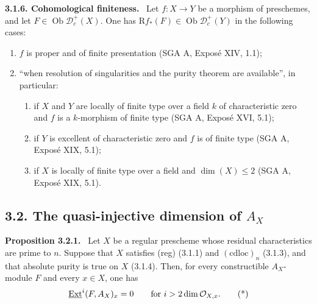 \documentclass[11pt]{article}
\theoremstyle{plain}
\theoremstyle{definition}
\theoremstyle{remark}
\newenvironment{statement}[1]{\par\medskip\noindent\textbf{#1.}\ }{\par\medskip}
\newcommand{\D}{\mathcal D}\newcommand{\E}{\mathcal E}\newcommand{\F}{\mathcal F}
\DeclareMathOperator{\ob}{Ob}
\newcommand{\R}{\mathrm R}
\begin{document}
\begin{statement}{3.1.6. Cohomological finiteness}
Let $f:X\to Y$ be a morphism of preschemes, and let $F\in\ob\D_c^+(X)$. One has $\R f_*(F)\in\ob\D_c^+(Y)$ in the following cases:
\begin{enumerate}[label=\alph*)]
\item $f$ is proper and of finite presentation (SGA A, Exposé XIV, 1.1);
\item ``when resolution of singularities and the purity theorem are available'', in particular:
\begin{enumerate}[label=(\roman*)]
\item if $X$ and $Y$ are locally of finite type over a field $k$ of characteristic zero and $f$ is a $k$-morphism of finite type (SGA A, Exposé XVI, 5.1);
\item if $Y$ is excellent of characteristic zero and $f$ is of finite type (SGA A, Exposé XIX, 5.1);
\item if $X$ is locally of finite type over a field and $\dim(X)\le2$ (SGA A, Exposé XIX, 5.1).
\end{enumerate}
\end{enumerate}
\end{statement}

\subsection*{3.2. The quasi-injective dimension of $A_X$}

\begin{statement}{Proposition 3.2.1}
Let $X$ be a regular prescheme whose residual characteristics are prime to $n$. Suppose that $X$ satisfies (reg) (3.1.1) and $(\mathrm{cdloc})_n$ (3.1.3), and that absolute purity is true on $X$ (3.1.4). Then, for every constructible $A_X$-module $F$ and every $x\in X$, one has
\[
   \underline{\operatorname{Ext}}^i(F,A_X)_x=0\qquad\text{for } i>2\dim\mathcal O_{X,x}.\tag{*}
\]
\end{statement}
\end{document}
